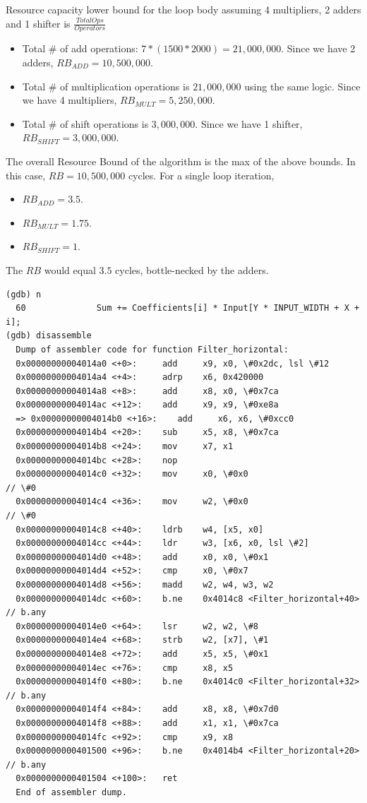 \documentclass[
  course = {{ESE532 System-on-a-Chip}},
  quartile = {{}},
  assignment = 2,
  name = {{Sheil Sarda}},
  studentnumber = {{}},
  email = {{sheils@seas.upenn.edu}},
  firstexercise = 1
]{aga-homework}
\begin{document}
\subexercise Resource capacity lower bound for the loop body assuming 4 multipliers, 2 adders and 1 shifter is $\frac{Total Ops}{Operators}$
\begin{itemize}
	\item Total \# of add operations: $7 * (1500*2000) = 21,000,000$. Since we have 2 adders, $RB_{ADD} = 10,500,000$.
	\item Total \# of multiplication operations is $21,000,000$ using the same logic. Since we have 4 multipliers, $RB_{MULT} = 5,250,000$.
	\item Total \# of shift operations is $3,000,000$. Since we have 1 shifter, $RB_{SHIFT} = 3,000,000$.
\end{itemize}
The overall Resource Bound of the algorithm is the max of the above bounds. In this case, $RB = 10,500,000$ cycles.
\newline \newline
For a single loop iteration, 
\begin{itemize}
	\item $RB_{ADD} = 3.5$.
	\item $RB_{MULT} = 1.75$.
	\item $RB_{SHIFT} = 1$.
\end{itemize}
The $RB$ would equal $3.5$ cycles, bottle-necked by the adders.
\newpage
\exercise
\subexercise
\begin{verbatim}
(gdb) n
  60              Sum += Coefficients[i] * Input[Y * INPUT_WIDTH + X + i];
(gdb) disassemble
  Dump of assembler code for function Filter_horizontal:
  0x00000000004014a0 <+0>:     add     x9, x0, \#0x2dc, lsl \#12
  0x00000000004014a4 <+4>:     adrp    x6, 0x420000
  0x00000000004014a8 <+8>:     add     x8, x0, \#0x7ca
  0x00000000004014ac <+12>:    add     x9, x9, \#0xe8a
  => 0x00000000004014b0 <+16>:    add     x6, x6, \#0xcc0
  0x00000000004014b4 <+20>:    sub     x5, x8, \#0x7ca
  0x00000000004014b8 <+24>:    mov     x7, x1
  0x00000000004014bc <+28>:    nop
  0x00000000004014c0 <+32>:    mov     x0, \#0x0                        // \#0
  0x00000000004014c4 <+36>:    mov     w2, \#0x0                        // \#0
  0x00000000004014c8 <+40>:    ldrb    w4, [x5, x0]
  0x00000000004014cc <+44>:    ldr     w3, [x6, x0, lsl \#2]
  0x00000000004014d0 <+48>:    add     x0, x0, \#0x1
  0x00000000004014d4 <+52>:    cmp     x0, \#0x7
  0x00000000004014d8 <+56>:    madd    w2, w4, w3, w2
  0x00000000004014dc <+60>:    b.ne    0x4014c8 <Filter_horizontal+40>  // b.any
  0x00000000004014e0 <+64>:    lsr     w2, w2, \#8
  0x00000000004014e4 <+68>:    strb    w2, [x7], \#1
  0x00000000004014e8 <+72>:    add     x5, x5, \#0x1
  0x00000000004014ec <+76>:    cmp     x8, x5
  0x00000000004014f0 <+80>:    b.ne    0x4014c0 <Filter_horizontal+32>  // b.any
  0x00000000004014f4 <+84>:    add     x8, x8, \#0x7d0
  0x00000000004014f8 <+88>:    add     x1, x1, \#0x7ca
  0x00000000004014fc <+92>:    cmp     x9, x8
  0x0000000000401500 <+96>:    b.ne    0x4014b4 <Filter_horizontal+20>  // b.any
  0x0000000000401504 <+100>:   ret
  End of assembler dump.
\end{verbatim}
\end{document}
